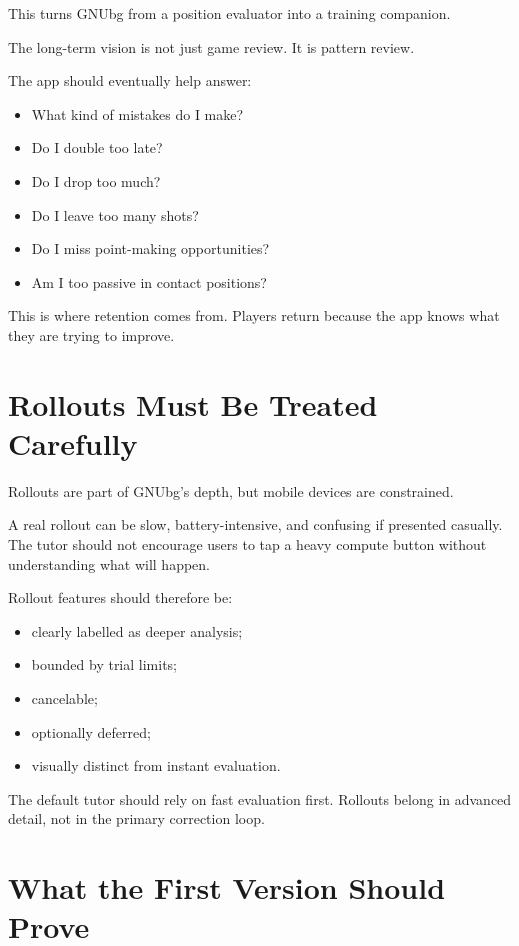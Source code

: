 \documentclass[11pt,a4paper]{article}
\begin{document}
This turns GNUbg from a position evaluator into a training companion.

The long-term vision is not just game review. It is pattern review.

The app should eventually help answer:

\begin{itemize}
  \item What kind of mistakes do I make?
  \item Do I double too late?
  \item Do I drop too much?
  \item Do I leave too many shots?
  \item Do I miss point-making opportunities?
  \item Am I too passive in contact positions?
\end{itemize}

This is where retention comes from. Players return because the app knows what they are trying to improve.

\section{Rollouts Must Be Treated Carefully}

Rollouts are part of GNUbg's depth, but mobile devices are constrained.

A real rollout can be slow, battery-intensive, and confusing if presented casually. The tutor should not encourage users to tap a heavy compute button without understanding what will happen.

Rollout features should therefore be:

\begin{itemize}
  \item clearly labelled as deeper analysis;
  \item bounded by trial limits;
  \item cancelable;
  \item optionally deferred;
  \item visually distinct from instant evaluation.
\end{itemize}

The default tutor should rely on fast evaluation first. Rollouts belong in advanced detail, not in the primary correction loop.

\section{What the First Version Should Prove}
\end{document}
